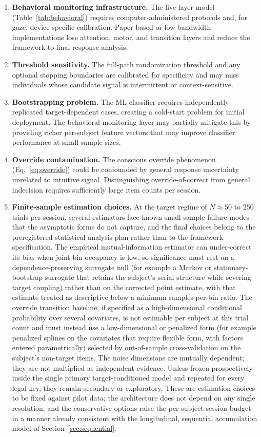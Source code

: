 \documentclass[11pt,letterpaper]{article}
\begin{document}
\begin{enumerate}
    \item \textbf{Behavioral monitoring infrastructure.} The five-layer model (Table~\ref{tab:behavioral}) requires computer-administered protocols and, for gaze, device-specific calibration. Paper-based or low-bandwidth implementations lose attention, motor, and transition layers and reduce the framework to final-response analysis.
    \item \textbf{Threshold sensitivity.} The full-path randomization threshold and any optional stopping boundaries are calibrated for specificity and may miss individuals whose candidate signal is intermittent or context-sensitive.
    \item \textbf{Bootstrapping problem.} The ML classifier requires independently replicated target-dependent cases, creating a cold-start problem for initial deployment. The behavioral monitoring layer may partially mitigate this by providing richer per-subject feature vectors that may improve classifier performance at small sample sizes.
    \item \textbf{Override contamination.} The conscious override phenomenon (Eq.~\ref{eq:override}) could be confounded by general response uncertainty unrelated to intuitive signal. Distinguishing override-of-correct from general indecision requires sufficiently large item counts per session.
    \item \textbf{Finite-sample estimation choices.} At the target regime of $N \approx 50$ to $250$ trials per session, several estimators face known small-sample failure modes that the asymptotic forms do not capture, and the final choices belong to the preregistered statistical analysis plan rather than to the framework specification. The empirical mutual-information estimator can under-correct its bias when joint-bin occupancy is low, so significance must rest on a dependence-preserving surrogate null (for example a Markov or stationary-bootstrap surrogate that retains the subject's serial structure while severing target coupling) rather than on the corrected point estimate, with that estimate treated as descriptive below a minimum samples-per-bin ratio. The override transition baseline, if specified as a high-dimensional conditional probability over several covariates, is not estimable per subject at this trial count and must instead use a low-dimensional or penalized form (for example penalized splines on the covariates that require flexible form, with factors entered parametrically) selected by out-of-sample cross-validation on the subject's non-target items. The noise dimensions are mutually dependent; they are not multiplied as independent evidence. Unless frozen prospectively inside the single primary target-conditioned model and repeated for every legal key, they remain secondary or exploratory. These are estimation choices to be fixed against pilot data; the architecture does not depend on any single resolution, and the conservative options raise the per-subject session budget in a manner already consistent with the longitudinal, sequential accumulation model of Section~\ref{sec:sequential}.

\end{enumerate}
\end{document}
